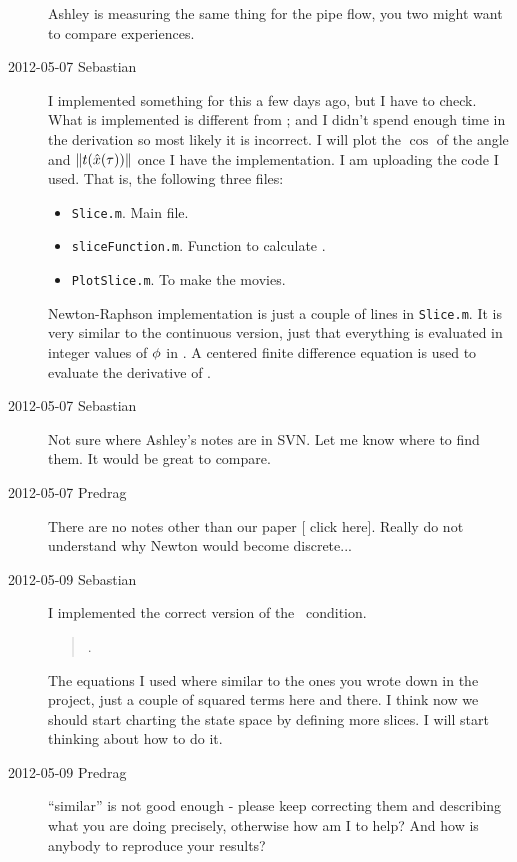 \begin{description}
Ashley is measuring the same thing for the pipe flow, you two might want
to compare experiences.

\item[2012-05-07 Sebastian]
I
implemented something for this a few days ago, but I have to check. What
is implemented is different from ; and I didn't spend enough
time in the derivation so most likely it is incorrect. I will plot the
$\cos$ of the angle and $\|{t(\hat{x}(\tau))}\|$ once I have
the implementation. I am uploading the code I used. That is, the
following three files:
\begin{itemize}
  \item \verb"Slice.m". Main file.
  \item \verb"sliceFunction.m". Function to calculate .
  \item \verb"PlotSlice.m". To make the movies.
\end{itemize}
Newton-Raphson implementation is just a couple of lines in
\verb"Slice.m". It is very similar to the continuous version, just that
everything is evaluated in integer values of ${\bf \phi}$ in . A
centered finite difference equation is used to evaluate the derivative of
.

\item[2012-05-07 Sebastian]
Not sure where Ashley's notes are in SVN. Let me know where
 to find them. It would be great to compare.

\item[2012-05-07 Predrag] There are no notes other than our
paper
[
{click here}]. Really do not understand why Newton would become
discrete...

\item[2012-05-09 Sebastian]
I implemented the correct version of the \chartBord\ condition.
\begin{quote}
.
\end{quote}
The equations I used where similar to the ones you wrote down in the
project, just a couple of squared terms here and there. I think now we
should start charting the state space by defining more slices. I will
start thinking about how to do it.

\item[2012-05-09 Predrag] ``similar'' is not good enough - please keep
correcting them and describing what you are doing precisely, otherwise
how am I to help? And how is anybody to reproduce your results?


\end{description}

